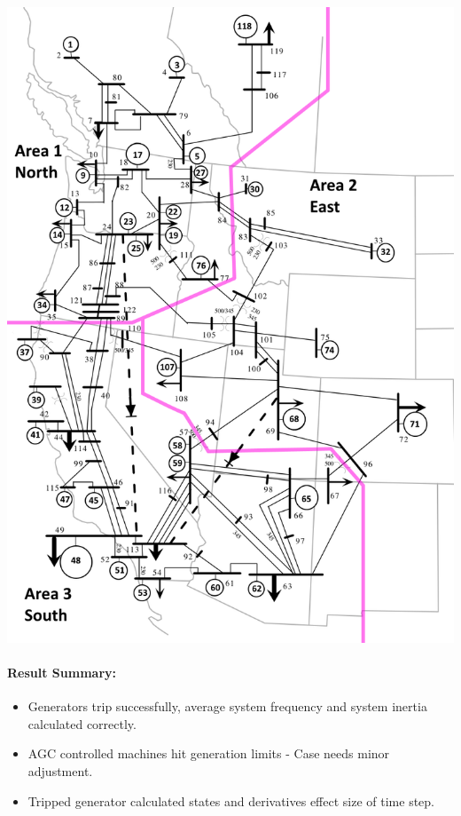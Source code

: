 \documentclass[12pt]{article}
\begin{document}
\begin{minipage}{0.47\linewidth}
\includegraphics[width=.97\linewidth]{miniWECC_split03.png}
\end{minipage}%

\paragraph{Result Summary:}
\begin{itemize}
\item Generators trip successfully, average system frequency and system inertia calculated correctly.
\item AGC controlled machines hit generation limits - Case needs minor adjustment.
\item Tripped generator calculated states and derivatives effect size of time step.
\end{itemize}
\end{document}

